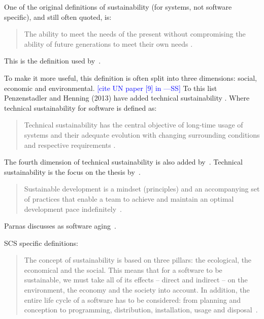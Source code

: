 \documentclass[letterpaper,cleveref]{lipics-v2019}
\newcommand{\authornote}[3]{\textcolor{#1}{[#3 ---#2]}}
\newcommand{\authornote}[3]{}
\newcommand{\wss}[1]{\authornote{blue}{SS}{#1}} %
\theoremstyle{definition}
\begin{document}
One of the original definitions of sustainability (for systems, not software
specific), and still often quoted, is:

\begin{quotation}
\noindent The ability to meet the needs of the present without compromising the ability of
future generations to meet their own needs \cite{Brundtland1987}.
\end{quotation}

This is the definition used by~\cite{IISD2019}.

To make it more useful, this definition is often split into three dimensions:
social, economic and environmental. \wss{cite UN paper [9] in
  \cite{PenzenstadlerAndHenning2013}}  To this list Penzenstadler and Henning
(2013) have added technical sustainability \cite{PenzenstadlerAndHenning2013}.
Where technical sustainability for software is defined as:

\begin{quotation}
\noindent Technical sustainability has the central objective of long-time
usage of systems and their adequate evolution with changing surrounding
conditions and respective requirements \cite{PenzenstadlerAndHenning2013}.
\end{quotation}

The fourth dimension of technical sustainability is also added
by~\cite{WolframEtAl2017}.  Technical sustainability is the focus on the thesis
by~\cite{Hygerth2016}.

\begin{quotation}
  \noindent Sustainable development is a mindset (principles) and an
  accompanying set of practices that enable a team to achieve and maintain an
  optimal development pace indefinitely~\cite{Tate2005}.
\end{quotation}

Parnas discusses as software aging~\cite{Parnas1994a}.

SCS specific definitions:

\begin{quotation}
  \noindent The concept of sustainability is based on three pillars: the
  ecological, the economical and the social. This means that for a software to
  be sustainable, we must take all of its effects -- direct and indirect -- on
  the environment, the economy and the society into account. In addition, the
  entire life cycle of a software has to be considered: from planning and
  conception to programming, distribution, installation, usage and
  disposal~\cite{Heine2017}.
\end{quotation}
\end{document}
